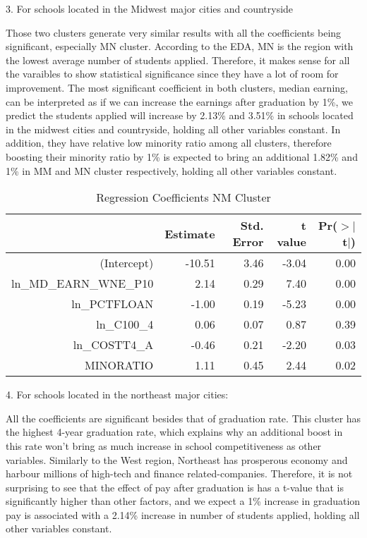 \documentclass{article}
\begin{document}
3. For schools located in the Midwest major cities and countryside

Those two clusters generate very similar results with all the coefficients being significant, especially MN cluster. According to the EDA, MN is the region with the lowest average number of students applied. Therefore, it makes sense for all the varaibles to show statistical significance since they have a lot of room for improvement. The most significant coefficient in both clusters, median earning, can be interpreted as if we can increase the earnings after graduation by 1\%, we predict the students applied will increase by 2.13\% and 3.51\% in schools located in the midwest cities and countryside, holding all other variables constant. In addition, they have relative low minority ratio among all clusters, therefore boosting their minority ratio by 1\% is expected to bring an additional 1.82\% and 1\% in MM and MN cluster respectively, holding all other variables constant.


\begin{Schunk}
\begin{Soutput}
\begin{table}[H]
\centering
\begin{tabular}{rrrrr}
  \hline
 & Estimate & Std. Error & t value & Pr($>$$|$t$|$) \\ 
  \hline
(Intercept) & -10.51 & 3.46 & -3.04 & 0.00 \\ 
  ln\_MD\_EARN\_WNE\_P10 & 2.14 & 0.29 & 7.40 & 0.00 \\ 
  ln\_PCTFLOAN & -1.00 & 0.19 & -5.23 & 0.00 \\ 
  ln\_C100\_4 & 0.06 & 0.07 & 0.87 & 0.39 \\ 
  ln\_COSTT4\_A & -0.46 & 0.21 & -2.20 & 0.03 \\ 
  MINORATIO & 1.11 & 0.45 & 2.44 & 0.02 \\ 
   \hline
\end{tabular}
\caption{Regression Coefficients NM Cluster} 
\end{table}
\end{Soutput}
\end{Schunk}

4. For schools located in the northeast major cities:

All the coefficients are significant besides that of graduation rate. This cluster has the highest 4-year graduation rate, which explains why an additional boost in this rate won't bring as much increase in school competitiveness as other variables. Similarly to the West region, Northeast has prosperous economy and harbour millions of high-tech and finance related-companies. Therefore, it is not surprising to see that the effect of pay after graduation is has a t-value that is significantly higher than other factors, and we expect a 1\% increase in graduation pay is associated with a 2.14\% increase in number of students applied, holding all other variables constant.
\end{document}
